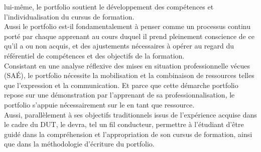{lui-même, le portfolio soutient le développement des compétences et
l'individualisation du cursus de formation.\\
Aussi le portfolio est-il fondamentalement à penser comme un processus
continu porté par chaque apprenant au cours duquel il prend pleinement
conscience de ce qu'il a ou non acquis, et des ajustements nécessaires à
opérer au regard du référentiel de compétences et des objectifs de la
formation.\\
Consistant en une analyse réflexive des mises en situation
professionnelle vécues (SAÉ), le portfolio nécessite la mobilisation et
la combinaison de ressources telles que l'expression et la
communication. Et parce que cette démarche portfolio repose sur une
démonstration par l'apprenant de sa professionnalisation, le portfolio
s'appuie nécessairement sur le  en tant que ressource.\\
Aussi, parallèlement à ses objectifs traditionnels issus de l'expérience
acquise dans le cadre du DUT, le  devra, tel un fil conducteur,
permettre à l'étudiant d'être guidé dans la compréhension et
l'appropriation de son cursus de formation, ainsi que dans la
méthodologie d'écriture du portfolio.}



